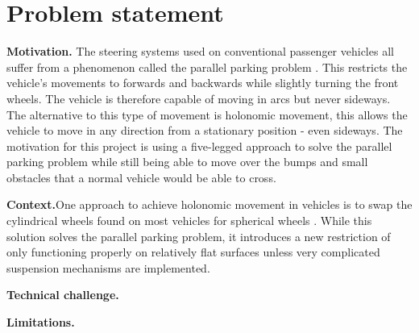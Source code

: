 
\section{Problem statement}

\textbf{Motivation.}
The steering systems used on conventional passenger vehicles all suffer from a phenomenon called the parallel parking problem \cite{parallel:1}. This restricts the vehicle's movements to forwards and backwards while slightly turning the front wheels. The vehicle is therefore capable of moving in arcs but never sideways. The alternative to this type of movement is holonomic movement, this allows the vehicle to move in any direction from a stationary position - even sideways.  The motivation for this project is using a five-legged approach to solve the parallel parking problem while still being able to move over the bumps and small obstacles that a normal vehicle would be able to cross.

\textbf{Context.}One approach to achieve holonomic movement in vehicles is to swap the cylindrical wheels found on most vehicles for spherical wheels \cite{Omni:1}. While this solution solves the parallel parking problem, it introduces  a new restriction of only functioning properly on relatively flat surfaces unless very complicated suspension mechanisms are implemented.

\textbf{Technical challenge.}

\textbf{Limitations.}



